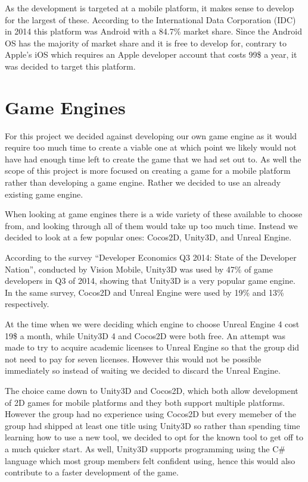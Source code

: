 As the development is targeted at a mobile platform, it makes sense to develop for the largest of these. 
According to the International Data Corporation (IDC) in 2014 this platform was Android with a 84.7\% market share\cite{marketshare}.
Since the Android OS has the majority of market share and it is free to develop for, contrary to Apple's iOS which requires an Apple developer account that costs 99\$ a year\cite{appledevprogram}, it was decided to target this platform.


\section{Game Engines}
For this project we decided against developing our own game engine as it would require too much time to create a viable one at which point we likely would not have had enough time left to create the game that we had set out to. 
As well the scope of this project is more focused on creating a game for a mobile platform rather than developing a game engine.
Rather we decided to use an already existing game engine.

When looking at game engines there is a wide variety of these available to choose from, and looking through all of them would take up too much time. 
Instead we decided to look at a few popular ones: Cocos2D, Unity3D, and Unreal Engine.

According to the survey ``Developer Economics Q3 2014: State of the Developer Nation''\cite{visionmobile-survey}, conducted by Vision Mobile\cite{visionmobile}, Unity3D was used by 47\% of game developers in Q3 of 2014, showing that Unity3D is a very popular game engine. 
In the same survey, Cocos2D and Unreal Engine were used by 19\% and 13\% respectively.

At the time when we were deciding which engine to choose Unreal Engine 4 cost 19\$ a month, while Unity3D 4 and Cocos2D were both free. 
An attempt was made to try to acquire academic licenses to Unreal Engine so that the group did not need to pay for seven licenses. 
However this would not be possible immediately so instead of waiting we decided to discard the Unreal Engine.

The choice came down to Unity3D and Cocos2D, which both allow development of 2D games for mobile platforms and they both support multiple platforms. 
However the group had no experience using Cocos2D but every memeber of the group had shipped at least one title using Unity3D so rather than spending time learning how to use a new tool, we decided to opt for the known tool to get off to a much quicker start. 
As well, Unity3D supports programming using the C\# language which most group members felt confident using, hence this would also contribute to a faster development of the game.